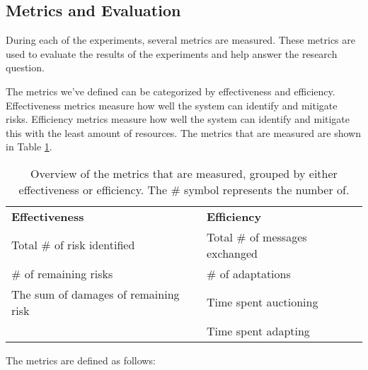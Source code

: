 \subsection{Metrics and Evaluation}
\label{ssec:metrics}
During each of the experiments, several metrics are measured. These metrics are used to evaluate the results of the experiments and help answer the research question. 

The metrics we've defined can be categorized by effectiveness and efficiency. Effectiveness metrics measure how well the system can identify and mitigate risks. Efficiency metrics measure how well the system can identify and mitigate this with the least amount of resources. The metrics that are measured are shown in Table \ref{table:metrics-groups}.

\begin{table}[H]
    \centering
    \begin{tabular}{l|l}
        \textbf{Effectiveness}            & \textbf{Efficiency}            \\
        Total \# of risk identified       & Total \# of messages exchanged \\
        \# of remaining risks             & \# of adaptations              \\
        The sum of damages of remaining risk & Time spent auctioning  \\
                                          & Time spent adapting            \\
    \end{tabular}
    \caption{\label{table:metrics-groups}Overview of the metrics that are measured, grouped by either effectiveness or efficiency. The \# symbol represents the number of.}
\end{table}


The metrics are defined as follows:

